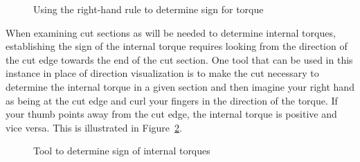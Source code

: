 \documentclass[
  letterpaper,
  DIV=11,
  numbers=noendperiod]{scrreprt}
\theoremstyle{definition}
\theoremstyle{remark}
\begin{document}
\begin{figure}


\caption{\label{fig-6.6}Using the right-hand rule to determine sign for
torque}

\end{figure}%

When examining cut sections as will be needed to determine internal
torques, establishing the sign of the internal torque requires looking
from the direction of the cut edge towards the end of the cut section.
One tool that can be used in this instance in place of direction
visualization is to make the cut necessary to determine the internal
torque in a given section and then imagine your right hand as being at
the cut edge and curl your fingers in the direction of the torque. If
your thumb points away from the cut edge, the internal torque is
positive and vice versa. This is illustrated in Figure~\ref{fig-6.7}.

\begin{figure}


\caption{\label{fig-6.7}Tool to determine sign of internal torques}

\end{figure}%
\end{document}
